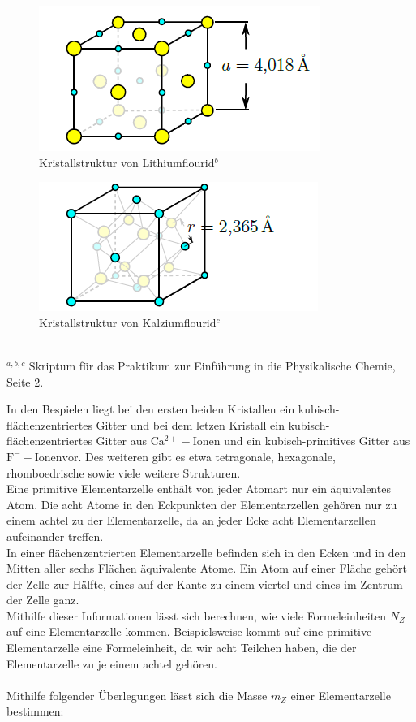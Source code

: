 \documentclass[12pt,a4paper,titlepage,headinclude,bibtotoc]{scrartcl}
\begin{document}
\begin{figure} [h]
\begin{center}
\includegraphics[scale=0.7]{Lithiumflourid.png} \end{center}
\caption{Kristallstruktur von Lithiumflourid$^b$}
\end{figure}

\begin{figure} [h]
\begin{center}
\includegraphics[scale=0.7]{Calciumflourid.png} \end{center}
\caption{Kristallstruktur von Kalziumflourid$^c$}
\end{figure}

\hrulefill\\
$^{a,b,c}$ Skriptum für das Praktikum zur Einführung in die Physikalische Chemie, Seite 2.

\vspace{10cm}
In den Bespielen liegt bei den ersten beiden Kristallen ein kubisch-flächenzentriertes Gitter und bei dem letzen Kristall ein kubisch-flächenzentriertes Gitter aus $\mathrm {Ca^{2+}-Ionen}$ und ein kubisch-primitives Gitter aus $ \mathrm {F^{-}-Ionen vor}$. Des weiteren gibt es etwa tetragonale, hexagonale, rhomboedrische sowie viele weitere Strukturen.\\ Eine primitive Elementarzelle enthält von jeder Atomart nur ein äquivalentes Atom. Die acht Atome in den Eckpunkten der Elementarzellen gehören nur zu einem achtel zu der Elementarzelle, da an jeder Ecke acht Elementarzellen aufeinander treffen.\\
In einer flächenzentrierten Elementarzelle befinden sich in den Ecken und in den Mitten aller sechs Flächen äquivalente Atome. Ein Atom auf einer Fläche gehört der Zelle zur Hälfte, eines auf der Kante zu einem viertel und eines im Zentrum der Zelle ganz.\\
Mithilfe dieser Informationen lässt sich berechnen, wie viele Formeleinheiten $N_{Z}$ auf eine Elementarzelle kommen. Beispielsweise kommt auf eine primitive Elementarzelle eine Formeleinheit, da wir acht Teilchen haben, die der Elementarzelle zu je einem achtel gehören.\\\\ Mithilfe folgender Überlegungen lässt sich die Masse $m_{Z}$ einer Elementarzelle bestimmen:
\end{document}
